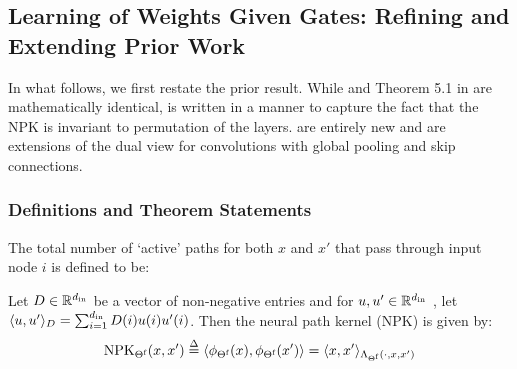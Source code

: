\subsection{Learning of Weights Given Gates: Refining and Extending Prior Work}\label{sec:analysis}

In what follows, we first restate the prior result. While  and Theorem 5.1 in \citep{npk} are mathematically identical,  is written in a manner to capture the fact that the NPK is invariant to permutation of the layers.  are entirely new and are extensions of the dual view for convolutions with global pooling and skip connections. 

\subsubsection{Definitions and Theorem Statements}

\begin{definition}\label{def:overlap} 
The total number of `active' paths for both $x$ and $x'$ that pass through input node $i$ is defined to be:

{\par}
\end{definition}
%
\begin{lemma}\label{lm:npk}
Let $D\in\mathbb{R}^{d_{\text{in}}}$ be a vector of non-negative entries  and for $u,u'\in\mathbb{R}^{d_{\text{in}}}$ , let $\langle u,u'\rangle_{D}=\sum_{i=1}^{d_{\text{in}}}D(i)u(i)u'(i)$. Then the neural path kernel (NPK) is given by: 
\begin{align*} 
\text{NPK}_{\Theta^{\textrm{f}}}(x,x')\stackrel{\Delta}{=} \langle \phi_{\Theta^{\textrm{f}}}(x),\phi_{\Theta^{\textrm{f}}}(x')\rangle= \langle x,x'\rangle_{\Lambda_{\Theta^{\textrm{f}}}(\cdot,x,x')} 
\end{align*}
\end{lemma}




